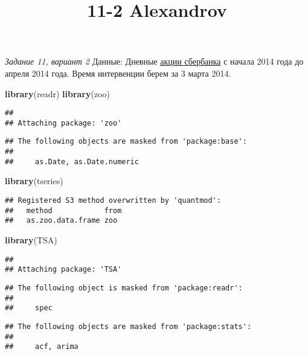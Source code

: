 \documentclass[
]{article}
\title{11-2 Alexandrov}
\author{}
\date{\vspace{-2.5em}}
\newenvironment{Shaded}{\begin{snugshade}}{\end{snugshade}}
\newcommand{\KeywordTok}[1]{\textcolor[rgb]{0.13,0.29,0.53}{\textbf{#1}}}
\newcommand{\NormalTok}[1]{#1}
\begin{document}
\maketitle

\emph{Задание 11, вариант 2} Данные: Дневные
\href{https://www.finam.ru/profile/moex-akcii/sberbank/export/}{акции
сбербанка} с начала 2014 года до апреля 2014 года. Время интервенции
берем за 3 марта 2014.

\begin{Shaded}
\begin{Highlighting}[]
\KeywordTok{library}\NormalTok{(readr)}
\KeywordTok{library}\NormalTok{(zoo)}
\end{Highlighting}
\end{Shaded}

\begin{verbatim}
## 
## Attaching package: 'zoo'
\end{verbatim}

\begin{verbatim}
## The following objects are masked from 'package:base':
## 
##     as.Date, as.Date.numeric
\end{verbatim}

\begin{Shaded}
\begin{Highlighting}[]
\KeywordTok{library}\NormalTok{(tseries)}
\end{Highlighting}
\end{Shaded}

\begin{verbatim}
## Registered S3 method overwritten by 'quantmod':
##   method            from
##   as.zoo.data.frame zoo
\end{verbatim}

\begin{Shaded}
\begin{Highlighting}[]
\KeywordTok{library}\NormalTok{(TSA)}
\end{Highlighting}
\end{Shaded}

\begin{verbatim}
## 
## Attaching package: 'TSA'
\end{verbatim}

\begin{verbatim}
## The following object is masked from 'package:readr':
## 
##     spec
\end{verbatim}

\begin{verbatim}
## The following objects are masked from 'package:stats':
## 
##     acf, arima
\end{verbatim}
\end{document}
